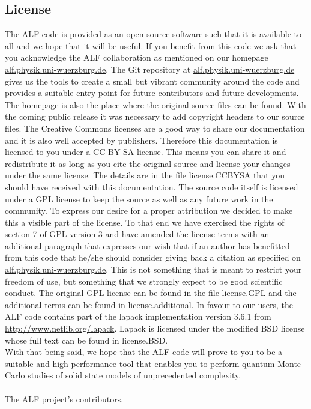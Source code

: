 \documentclass{SciPost}
\begin{document}
\begin{appendix}
\section{License}
%
The  ALF code  is provided as an open source software  such that it is  available  to all and we  hope that  it 
will be useful.  If you benefit from this code  we ask that you acknowledge  the ALF collaboration  as mentioned on our
homepage \url{alf.physik.uni-wuerzburg.de}.   The Git repository at   \url{alf.physik.uni-wuerzburg.de} gives us the tools to 
create a small but vibrant community around the code and provides a suitable entry point for future contributors  and future developments. 
The homepage is also the place where the original source files can be found.
With the coming public release it was necessary to add copyright headers to our source files.
The Creative Commons licenses are a good way to share our documentation and it is also well 
accepted by publishers. Therefore this documentation is licensed to you under a CC-BY-SA license.
This means you can share it and redistribute it as long as you cite the original source and
license your changes under the same license. The details are in the file license.CCBYSA that you should have received with this documentation.
The source code itself is licensed under a GPL license to keep the source as well as any future work in the community.
To express our desire for a proper attribution we decided to make this a visible part of the license.
To that end we have exercised the rights of section 7 of GPL version 3 and have amended
the license terms with an additional paragraph that expresses our wish that if an author has benefitted from this code
that he/she should consider giving back a citation as specified on \url{alf.physik.uni-wuerzburg.de}.
This is not something that is meant to restrict your freedom of use, but something that we strongly expect to be good scientific conduct.
The original GPL license can be found in the file license.GPL and the additional terms can be found in license.additional.
In favour to our users, the ALF code contains part of the lapack implementation version 3.6.1 from \url{http://www.netlib.org/lapack}.
Lapack is licensed under the modified BSD license whose full text can be found in license.BSD.\\
With that being said, we hope that the ALF code will prove to you to be a suitable and high-performance tool that enables
you to perform quantum Monte Carlo studies of solid state models of unprecedented complexity.\\
\\
The ALF project's contributors.
%

\end{appendix}
\end{document}

